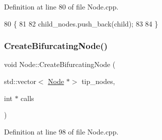 Definition at line 80 of file Node.\+cpp.


\begin{DoxyCode}
80                                           \{
81   
82   child\_nodes.push\_back(child);
83   
84 \}
\end{DoxyCode}
\mbox{\label{classNode_a73e4640e16847b3c1b655930c193d03b}} 
\subsubsection{\texorpdfstring{Create\+Bifurcating\+Node()}{CreateBifurcatingNode()}}
{\footnotesize\ttfamily void Node\+::\+Create\+Bifurcating\+Node (\begin{DoxyParamCaption}\item[{std\+::vector$<$ \hyperlink{classNode}{Node} $\ast$$>$}]{tip\+\_\+nodes,  }\item[{int $\ast$}]{calls }\end{DoxyParamCaption})}



Definition at line 98 of file Node.\+cpp.


